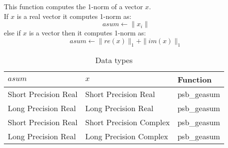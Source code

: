 %
%



This function computes the 1-norm of a vector $x$.\\
If $x$ is a real vector
it computes 1-norm as:
\[ asum \leftarrow  \|x_i\|\]
else if $x$ is a  vector then it computes 1-norm  as:
\[ asum \leftarrow \|re(x)\|_1 + \|im(x)\|_1\]



\begin{table}[h]
\begin{center}
\begin{tabular}{lll}
\hline
$asum$ & $x$ & {\bf Function}\\
\hline
Short Precision Real&Short Precision Real & psb\_geasum \\
Long Precision Real&Long Precision Real & psb\_geasum \\
Short Precision Real&Short Precision Complex & psb\_geasum \\
Long Precision Real&Long Precision Complex & psb\_geasum \\
\hline
\end{tabular}
\end{center}
\caption{Data types\label{tab:f90asum}}
\end{table}

